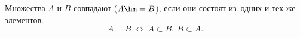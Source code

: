 
    Множества $A$ и $B$ совпадают ($A\hm=B$), если они состоят из~одних и тех же элементов.
        \[A=B\ \iff\ A\subset B,\ B\subset A.\]
